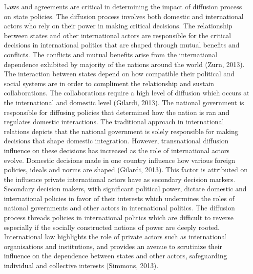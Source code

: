 \documentclass[11pt]{article}
\begin{document}
Laws and agreements are critical in determining the impact of diffusion process on state policies. The diffusion process involves both domestic and international actors who rely on their power in making critical decisions. The relationship between states and other international actors are responsible for the critical decisions in international politics that are shaped through mutual benefits and conflicts. The conflicts and mutual benefits arise from the international dependence exhibited by majority of the nations around the world (Zurn, 2013). The interaction between states depend on how compatible their political and social systems are in order to compliment the relationship and sustain collaborations. The collaborations require a high level of diffusion which occurs at the international and domestic level (Gilardi, 2013). The national government is responsible for diffusing policies that determined how the nation is ran and regulates domestic interactions. The traditional approach in international relations depicts that the national government is solely responsible for making decisions that shape domestic integration. However, transnational diffusion influence on these decisions has increased as the role of international actors evolve. Domestic decisions made in one country influence how various foreign policies, ideals and norms are shaped (Gilardi, 2013). This factor is attributed on the influence private international actors have as secondary decision markers. Secondary decision makers, with significant political power, dictate domestic and international policies in favor of their interests which undermines the roles of national governments and other actors in international politics. The diffusion process threads policies in international politics which are difficult to reverse especially if the socially constructed notions of power are deeply rooted. International law highlights the role of private actors such as international organisations and institutions, and provides an avenue to scrutinize their influence on the dependence between states and other actors, safeguarding individual and collective interests (Simmons, 2013).
\end{document}
